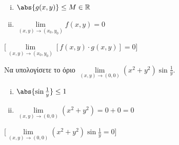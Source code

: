 \documentclass[a4paper,11pt]{report}
\begin{document}
  \begin{mybox2}
    \begin{thmbreak}
      \begin{minipage}{0.25\textwidth}
        \begin{enumerate}[i)]
          \item $ \abs{g(x,y)} \leq M \in \mathbb{R} $ \hfill {}
          \item $ \lim\limits_{(x,y)\to (x_{0}, y_{0})} f(x,y) = 0 $ \hfill {}
        \end{enumerate}
      \end{minipage}

      [$ \lim\limits_{(x,y)\to (x_{0}, y_{0})} [f(x,y)\cdot g(x,y)] = 0 $]
    \end{thmbreak}
  \end{mybox2}


  \begin{example}
    Να υπολογίσετε το όριο $ \lim\limits_{(x,y)\to (0, 0)} (x^{2}+y^{2}) 
    \sin{\frac{1}{y}} $.  

    \begin{solution}
    \item {}
      \begin{minipage}{0.30\textwidth}
        \begin{enumerate}[i)]
          \item $ \abs{\sin{\frac{1}{y}}} \leq 1 $ \hfill {}
          \item $ \lim\limits_{(x,y)\to (0, 0)} (x^{2}+y^{2}) = 0+0=0 $ 
            \hfill {}
        \end{enumerate}
      \end{minipage}
      [$ \lim\limits_{(x,y)\to (0, 0)} (x^{2}+y^{2}) \sin{\frac{1}{y}} 
      = 0$]
    \end{solution}
  \end{example}
\end{document}
